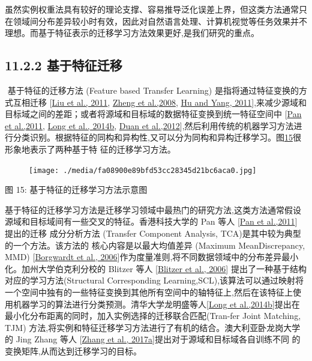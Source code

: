 ​
虽然实例权重法具有较好的理论支撑、容易推导泛化误差上界，但这类方法通常只在领域间分布差异较小时有效，因此对自然语言处理、计算机视觉等任务效果并不理想。而基于特征表示的迁移学习方法效果更好,是我们研究的重点。

\subsection{11.2.2
基于特征迁移}\label{ux57faux4e8eux7279ux5f81ux8fc1ux79fb}

​ 基于特征的迁移方法 (Feature based Transfer Learning)
是指将通过特征变换的方式互相迁移 {[}\protect\hyperlink{bookmark272}{Liu
et al., 2011}, \protect\hyperlink{bookmark327}{Zheng et al.,2008},
\protect\hyperlink{bookmark263}{Hu and Yang,
2011}{]},来减少源域和目标域之间的差距；或者将源域和目标域的数据特征变换到统一特征空间中
{[}\protect\hyperlink{bookmark288}{Pan et al.,2011},
\protect\hyperlink{bookmark278}{Long et al., 2014b},
\protect\hyperlink{bookmark248}{Duan et
al.,2012}{]},然后利用传统的机器学习方法进行分类识别。根据特征的同构和异构性,又可以分为同构和异构迁移学习。图\protect\hyperlink{bookmark93}{15}很形象地表示了两种基于特
征的迁移学习方法。

\begin{figure}
\centering
\texttt{[image: ./media/fa08900e89bfd53cc28345d21bc6aca0.jpg]}
\caption{}
\end{figure}

图 15: 基于特征的迁移学习方法示意图

​
基于特征的迁移学习方法是迁移学习领域中最热门的研究方法,这类方法通常假设源域和目标域间有一些交叉的特征。香港科技大学的
Pan 等人 {[}\protect\hyperlink{bookmark288}{Pan et al.,2011}{]}
提出的迁移 成分分析方法 (Transfer Component Analysis,
TCA)是其中较为典型的一个方法。该方法的 核心内容是以最大均值差异 (Maximum
MeanDiscrepancy, MMD) {[}\protect\hyperlink{bookmark236}{Borgwardt et
al.,
2006}{]}作为度量准则,将不同数据领域中的分布差异最小化。加州大学伯克利分校的
Blitzer 等人 {[}\protect\hyperlink{bookmark235}{Blitzer et al., 2006}{]}
提出了一种基于结构对应的学习方法(Structural Corresponding
Learning,SCL),该算法可以通过映射将一个空间中独有的一些特征变换到其他所有空间中的轴特征上,然后在该特征上使用机器学习的算法进行分类预测。清华大学龙明盛等人{[}\protect\hyperlink{bookmark278}{Long
et
al.,2014b}{]}提出在最小化分布距离的同时，加入实例选择的迁移联合匹配(Tran-fer
Joint Matching, TJM)
方法,将实例和特征迁移学习方法进行了有机的结合。澳大利亚卧龙岗大学的 Jing
Zhang 等人 {[}\protect\hyperlink{bookmark321}{Zhang et al.,
2017a}{]}提出对于源域和目标域各自训练不同
的变换矩阵,从而达到迁移学习的目标。


